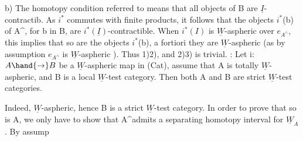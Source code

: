 b)  The homotopy condition  referred to means that all objects of
B are  $\underline{I}$-contractib.  As $i^*$ commutes with finite products,  it follows
that the objects $i^*$(b) of A\^{}, for b in B,  are $i^*(\underline{I})$-contractible.  When
$i^*(I)$ is $\underline{W}$-aspheric over $e_{A^\wedge}$,  this implies that  so are the
objects $i^*$(b),   a fortiori they are  $\underline{W}$-aspheric  (as by assumption
$e_{A^\wedge}$ is $\underline{W}$-aspheric ).  Thus  1)\hand{$\Longrightarrow$}2),  and  2)\hand{$\Longrightarrow$}3)  is trivial.
\hand{\uline{\textcolor{black}{Corollary}}} :  Let  i: $A\hand{\to} B$ be a $\underline{W}$-aspheric map in (Cat),  assume that
A is totally $\underline{W}$-aspheric,  and B is a local $\underline{W}$-test category.  Then both
A and B are strict $\underline{W}$-test categories.

Indeed,   
 $\underline{W}$-aspheric,  hence B is a
strict $\underline{W}$-test category.  In order to prove that so is A,  we only have
to show that  A\^{}admits a separating homotopy interval for $\underline{W}_A$ .  By assump
